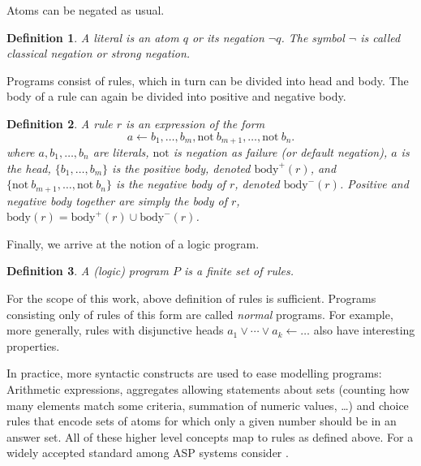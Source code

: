 \documentclass{vutinfth} %
\newtheorem{definition}{Definition}[section]
\newcommand{\bodyf}{\mathrm{body}}
\newcommand{\fail}{\mathrm{not } \ \xspace}
\newcommand{\from}{\ensuremath{\leftarrow}}
\begin{document}
Atoms can be negated as usual.

\begin{definition}
A \emph{literal} is an atom $q$ or its negation $\neg q$. The symbol $\neg$ is called \emph{classical negation} or \emph{strong negation}.
\end{definition}

Programs consist of rules, which in turn can be divided into head and body. The body of a rule can again be divided into positive and negative body.

\begin{definition}
	A \emph{rule} $r$ is an expression of the form $$a \from b_1, \ldots, b_m, \fail b_{m+1}, \ldots, \fail b_n.$$ where $a, b_1, \ldots, b_n$ are literals, $\mathrm{not}$ is \emph{negation as failure} (or \emph{default negation}), $a$ is the \emph{head}, $\{ b_1, \ldots, b_m \}$ is the \emph{positive body}, denoted $\bodyf^+(r)$, and $\{ \fail b_{m+1}, \ldots, \fail b_n \}$ is the \emph{negative body} of $r$, denoted $\bodyf^-(r)$. Positive and negative body together are simply the \emph{body} of $r$, $\bodyf(r) = \bodyf^+(r)\cup \bodyf^-(r)$.
\end{definition}

Finally, we arrive at the notion of a logic program.

\begin{definition}
A \emph{(logic) program} $P$ is a finite set of rules.
\end{definition}


For the scope of this work, above definition of rules is sufficient. Programs consisting only of rules of this form are called \emph{normal} programs. For example, more generally, rules with disjunctive heads $a_1 \vee \cdots \vee a_k \from \ldots$ also have interesting properties.

In practice, more syntactic constructs are used to ease modelling programs: Arithmetic expressions, aggregates allowing statements about sets (counting how many elements match some criteria, summation of numeric values, \ldots) and choice rules that encode sets of atoms for which only a given number should be in an answer set. All of these higher level concepts map to rules as defined above. For a widely accepted standard among ASP systems consider \cite{calimeri2015asp}.

\end{document}
